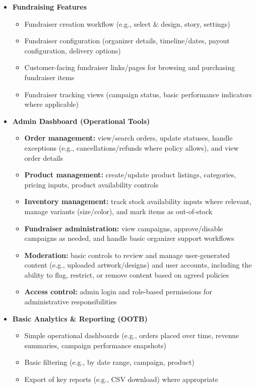 \begin{itemize}[leftmargin=1.5em]
    \item \textbf{Fundraising Features}
    \begin{itemize}
        \item Fundraiser creation workflow (e.g., select \& design, story, settings)
        \item Fundraiser configuration (organizer details, timeline/dates, payout configuration, delivery options)
        \item Customer-facing fundraiser links/pages for browsing and purchasing fundraiser items
        \item Fundraiser tracking views (campaign status, basic performance indicators where applicable)
    \end{itemize}

    \item \textbf{Admin Dashboard (Operational Tools)}
    \begin{itemize}
        \item \textbf{Order management:} view/search orders, update statuses, handle exceptions (e.g., cancellations/refunds where policy allows),
        and view order details
        \item \textbf{Product management:} create/update product listings, categories, pricing inputs, product availability controls
        \item \textbf{Inventory management:} track stock availability inputs where relevant, manage variants (size/color), and mark items as out-of-stock
        \item \textbf{Fundraiser administration:} view campaigns, approve/disable campaigns as needed, and handle basic organizer support workflows
        \item \textbf{Moderation:} basic controls to review and manage user-generated content (e.g., uploaded artwork/designs) and user accounts,
        including the ability to flag, restrict, or remove content based on agreed policies
        \item \textbf{Access control:} admin login and role-based permissions for administrative responsibilities
    \end{itemize}

    \item \textbf{Basic Analytics \& Reporting (OOTB)}
    \begin{itemize}
        \item Simple operational dashboards (e.g., orders placed over time, revenue summaries, campaign performance snapshots)
        \item Basic filtering (e.g., by date range, campaign, product)
        \item Export of key reports (e.g., CSV download) where appropriate
    \end{itemize}

\end{itemize}

